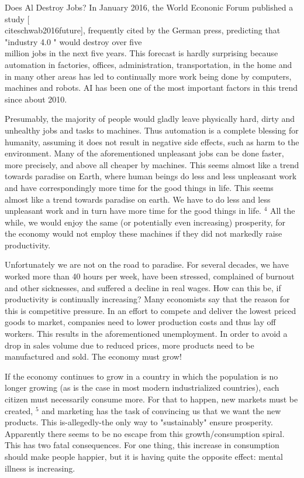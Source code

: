 \documentclass[10pt]{book}
\begin{document}
Does Al Destroy Jobs?
In January 2016, the World Econonic Forum published a study [\\cite{schwab2016future}], frequently cited by the German press, predicting that "industry 4.0 " would destroy over five\\
million jobs in the next five years. This forecast is hardly surprising because automation in factories, offices, administration, transportation, in the home and in many other areas has led to continually more work being done by computers, machines and robots. AI has been one of the most important factors in this trend since about 2010.


Presumably, the majority of people would gladly leave physically hard, dirty and unhealthy jobs and tasks to machines. Thus automation is a complete blessing for humanity, assuming it does not result in negative side effects, such as harm to the environment. Many of the aforementioned unpleasant jobs can be done faster, more precisely, and above all cheaper by machines. This seems almost like a trend towards paradise on Earth, where human beings do less and less unpleasant work and have correspondingly more time for the good things in life. This seems almost like a trend towards paradise on earth. We have to do less and less unpleasant work and in turn have more time for the good things in life. ${ }^{4}$ All the while, we would enjoy the same (or potentially even increasing) prosperity, for the economy would not employ these machines if they did not markedly raise productivity.

Unfortunately we are not on the road to paradise. For several decades, we have worked more than 40 hours per week, have been stressed, complained of burnout and other sicknesses, and suffered a decline in real wages. How can this be, if productivity is continually increasing? Many economists say that the reason for this is competitive pressure. In an effort to compete and deliver the lowest priced goods to market, companies need to lower production costs and thus lay off workers. This results in the aforementioned unemployment. In order to avoid a drop in sales volume due to reduced prices, more products need to be manufactured and sold. The economy must grow!

If the economy continues to grow in a country in which the population is no longer growing (as is the case in most modern industrialized countries), each citizen must necessarily consume more. For that to happen, new markets must be created, ${ }^{5}$ and marketing has the task of convincing us that we want the new products. This is-allegedly-the only way to "sustainably" ensure prosperity. Apparently there seems to be no escape from this growth/consumption spiral. This has two fatal consequences. For one thing, this increase in consumption should make people happier, but it is having quite the opposite effect: mental illness is increasing.
\end{document}
